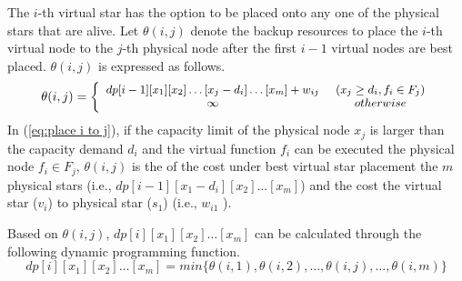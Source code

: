 The $i$-th virtual star has the option to  be placed onto any one of the physical stars that are alive. Let $\theta (i,j)$ denote  the backup resources to place the $i$-th virtual node  to the $j$-th physical node after the first $i-1$ virtual nodes are best placed. $\theta (i,j)$ is expressed as follows.
\begin{equation}
\footnotesize
\theta (i,j) = \left\{ {\begin{array}{*{20}{c}}
{dp[i - 1][x_1][{x_2}] \ldots [{x_j} - {d_i}] \ldots [{x_m}] + {w_{ij}}}\\
\infty
\end{array}} \right.\begin{array}{*{20}{c}}
{({x_j} \ge {d_i},{f_i} \in {F_j})}\\
{otherwise}
\end{array}
\label{eq:place i to j}
\end{equation}
In (\ref{eq:place i to j}), if the capacity  limit of the  physical node $x_j$ is larger than the capacity demand $d_i$ and the virtual function $f_i$ can be executed  the physical node ${f_i} \in {F_j}$,  $\theta (i,j)$ is the  of   the cost under  best virtual star placement  the $m$ physical stars  (i.e., $dp[i-1][{x_1} - {d_i}][{x_2}] \ldots [{x_m}]$) and the cost  the virtual star ($v_i$) to  physical star ($s_1$) (i.e., $w_{i1}$ ). 



Based on $\theta (i,j)$, $dp[i][{x_1}][{x_2}] \ldots [{x_m}]$ can be calculated through the following dynamic programming function.
\begin{equation}
dp[i][{x_1}][{x_2}] \ldots [{x_m}] = min\{\theta (i,1),\theta (i,2),\ldots,\theta (i,j),\ldots,\theta (i,m)\}
\label{eq:update function}
\end{equation}


